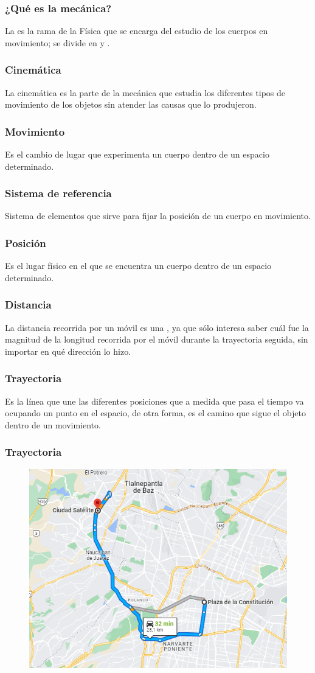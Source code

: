 \documentclass[14pt]{beamer}
\begin{document}
\begin{frame}
\frametitle{¿Qué es la mecánica?}
La  es la rama de la Física que se encarga del estudio de los cuerpos en movimiento; \pause se divide en \pause {} \pause y .
\end{frame}
\begin{frame}
\frametitle{Cinemática}
La cinemática es la parte de la mecánica que estudia los diferentes tipos de movimiento de los objetos sin atender las causas que lo produjeron.
\end{frame}
\begin{frame}
\frametitle{Movimiento}
Es el cambio de lugar que experimenta un cuerpo dentro de un espacio determinado.
\end{frame}
\begin{frame}
\frametitle{Sistema de referencia}
Sistema de elementos que sirve para fijar la posición de un cuerpo en movimiento.
\end{frame}
\begin{frame}
\frametitle{Posición}
Es el lugar físico en el que se encuentra un cuerpo dentro de un espacio determinado.
\end{frame}
\begin{frame}
\frametitle{Distancia}
La distancia recorrida por un móvil es una , \pause ya que sólo interesa saber cuál fue la magnitud de la longitud recorrida por el móvil durante la trayectoria seguida, sin importar en qué dirección lo hizo.
\end{frame}
\begin{frame}
\frametitle{Trayectoria}
Es la línea que une las diferentes posiciones que a medida que pasa el tiempo va ocupando un punto en el espacio, \pause de otra forma, es el camino que sigue el objeto dentro de un movimiento.
\end{frame}
\begin{frame}
\frametitle{Trayectoria}
\begin{figure}
    \centering
    \includegraphics[scale=0.45]{Imagenes/Trayectoria_01.png}
\end{figure}
\end{frame}
\end{document}
